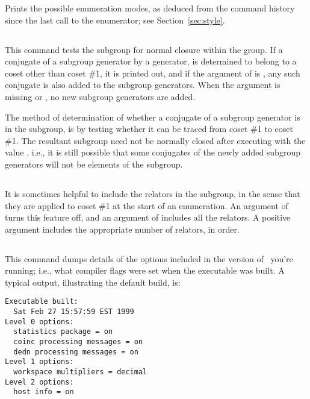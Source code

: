 Prints the possible enumeration modes, as deduced from the command history
  since the last call to the enumerator; see Section~\ref{sec:style}.

\subsection{}

This command tests the subgroup for normal closure within the group. 
If a conjugate of a subgroup generator by a generator, is determined
  to belong to a coset other than coset \#1, it is printed out, 
  and if the argument of  is , any such conjugate is 
  also added to the subgroup generators.
When the argument is missing or , no new subgroup generators are
  added.

The method of determination of whether a conjugate of a subgroup
  generator is in the subgroup, is by testing whether it can be traced
  from coset \#1 to coset \#1.
The resultant subgroup need not be normally closed after executing
   with the value , i.e., 
  it is still possible that some conjugates of the newly added subgroup 
  generators will not be elements of the subgroup.

\subsection{}

It is sometimes helpful to include the relators in the subgroup, in the
  sense that they are applied to coset \#1 at the start of an enumeration.
An argument of  turns this feature off, and an argument of 
  includes all the relators.
A positive argument includes the appropriate number of relators, in order.

\subsection{}

This command dumps details of the options included in the version of \ace\
  you're running; i.e., what compiler flags were set when the executable
  was built.
A typical output, illustrating the default build, is:

\bv\begin{verbatim}
Executable built:
  Sat Feb 27 15:57:59 EST 1999
Level 0 options:
  statistics package = on
  coinc processing messages = on
  dedn processing messages = on
Level 1 options:
  workspace multipliers = decimal
Level 2 options:
  host info = on
\end{verbatim}\ev

